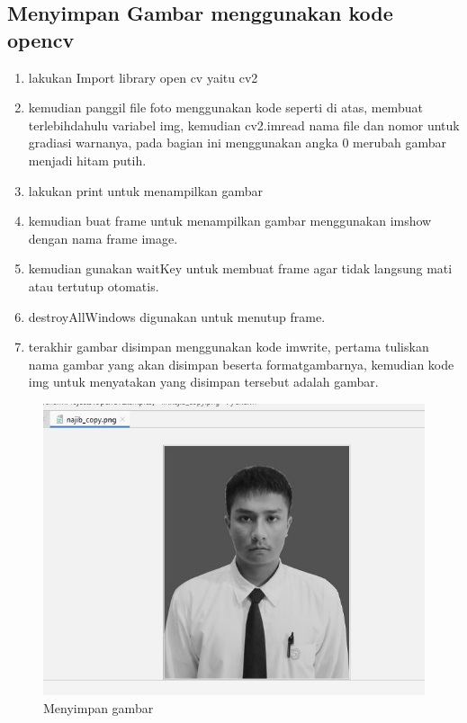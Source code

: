 \newpage
\subsection{Menyimpan Gambar menggunakan kode opencv}

\begin{enumerate}
	\item lakukan Import library open cv yaitu cv2
	\item kemudian panggil file foto menggunakan kode seperti di atas, membuat terlebihdahulu variabel img, kemudian cv2.imread nama file dan nomor untuk gradiasi warnanya, pada bagian ini menggunakan angka 0 merubah gambar menjadi hitam putih.
	\item lakukan print untuk menampilkan gambar
	\item kemudian buat frame untuk menampilkan gambar menggunakan imshow dengan nama frame image.
	\item kemudian gunakan waitKey untuk membuat frame agar tidak langsung mati atau tertutup otomatis.
	\item destroyAllWindows digunakan untuk menutup frame.
	\item terakhir gambar disimpan menggunakan kode imwrite, pertama tuliskan nama gambar yang akan disimpan beserta formatgambarnya, kemudian kode img untuk menyatakan yang disimpan tersebut adalah gambar.
\end{enumerate}

\newpage
\begin{figure}[ht]
\centering
\includegraphics[scale=0.7]{figures/2,3.jpg}
\caption{Menyimpan gambar}
\label{contoh}
\end{figure}

